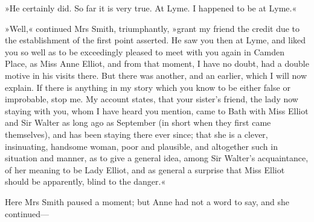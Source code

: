 »He certainly did. So far it is very true. At Lyme. I happened to be at Lyme.«

»Well,« continued Mrs Smith, triumphantly, »grant my friend the credit due to the establishment of the first point asserted. He saw you then at Lyme, and liked you so well as to be exceedingly pleased to meet with you again in Camden Place, as Miss Anne Elliot, and from that moment, I have no doubt, had a double motive in his visits there. But there was another, and an earlier, which I will now explain. If there is anything in my story which you know to be either false or improbable, stop me. My account states, that your sister's friend, the lady now staying with you, whom I have heard you mention, came to Bath with Miss Elliot and Sir Walter as long ago as September (in short when they first came themselves), and has been staying there ever since; that she is a clever, insinuating, handsome woman, poor and plausible, and altogether such in situation and manner, as to give a general idea, among Sir Walter's acquaintance, of her meaning to be Lady Elliot, and as general a surprise that Miss Elliot should be apparently, blind to the danger.«

Here Mrs Smith paused a moment; but Anne had not a word to say, and she continued—

